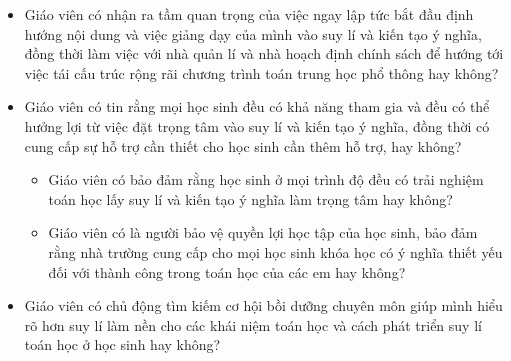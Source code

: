 {{\begin{itemize}
        \item Giáo viên có nhận ra tầm quan trọng của việc ngay lập tức bắt đầu định hướng nội dung và việc giảng dạy của mình vào suy lí và kiến tạo ý nghĩa, đồng thời làm việc với nhà quản lí và nhà hoạch định chính sách để hướng tới việc tái cấu trúc rộng rãi chương trình toán trung học phổ thông hay không?

        \item Giáo viên có tin rằng mọi học sinh đều có khả năng tham gia và đều có thể hưởng lợi từ việc đặt trọng tâm vào suy lí và kiến tạo ý nghĩa, đồng thời có cung cấp sự hỗ trợ cần thiết cho học sinh cần thêm hỗ trợ, hay không?
          \begin{itemize}
            \item Giáo viên có bảo đảm rằng học sinh ở mọi trình độ đều có trải nghiệm toán học lấy suy lí và kiến tạo ý nghĩa làm trọng tâm hay không?

            \item Giáo viên có là người bảo vệ quyền lợi học tập của học sinh, bảo đảm rằng nhà trường cung cấp cho mọi học sinh khóa học có ý nghĩa thiết yếu đối với thành công trong toán học của các em hay không?
          \end{itemize}

        \item Giáo viên có chủ động tìm kiếm cơ hội bồi dưỡng chuyên môn giúp mình hiểu rõ hơn suy lí làm nền cho các khái niệm toán học và cách phát triển suy lí toán học ở học sinh hay không?
      \end{itemize}}
  }
